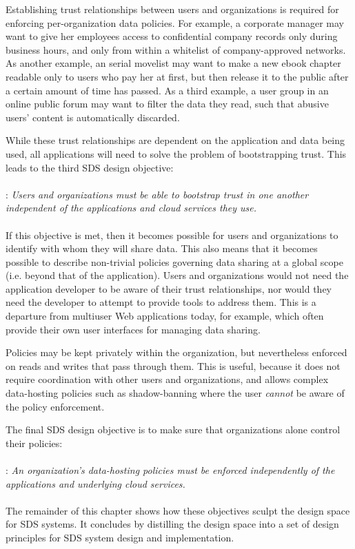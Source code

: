 Establishing trust relationships between users and organizations is required
for enforcing per-organization data policies.
For example, a corporate manager may want to give her employees access
to confidential company records only during business hours, and only from 
within a whitelist of company-approved networks.
As another example, an serial movelist may want to
make a new ebook chapter readable only to users who pay her at first, but then release it
to the public after a certain amount of time has passed.  As a third example,
a user group in an online public forum may want to filter the data they read,
such that abusive users' content is automatically discarded.

While these trust relationships are dependent on the application and data being
used, all applications will need to solve the problem of bootstrapping trust.
This leads to the third SDS design objective:
\\
\\
: \emph{Users and organizations must be able to bootstrap trust in one another independent of the
applications and cloud services they use.}
\\
\\
If this objective is met, then it becomes possible for users and organizations to
identify with whom they will share data.  This also means that it becomes
possible to describe non-trivial
policies governing data sharing at a global scope (i.e. beyond that of the
application).  Users and organizations would not need the application developer to be aware
of their trust relationships, nor would they need the developer to attempt to
provide tools to address them.  This is a departure from multiuser Web
applications today, for example, which often provide their own user interfaces
for managing data sharing.

Policies may be kept privately within the organization, but nevertheless enforced on reads
and writes that pass through them.  This is useful, because it does not require
coordination with other users and organizations, and allows complex data-hosting
policies such as shadow-banning where the user \emph{cannot} be aware of the
policy enforcement.

The final SDS design objective is to make sure that organizations alone control
their policies:
\\
\\
: \emph{An organization's data-hosting policies
must be enforced independently of the applications and
underlying cloud services.}
\\
\\
The remainder of this chapter shows how these objectives sculpt the design space
for SDS systems.  It concludes by distilling the design space into a set of
design principles for SDS system design and implementation.

